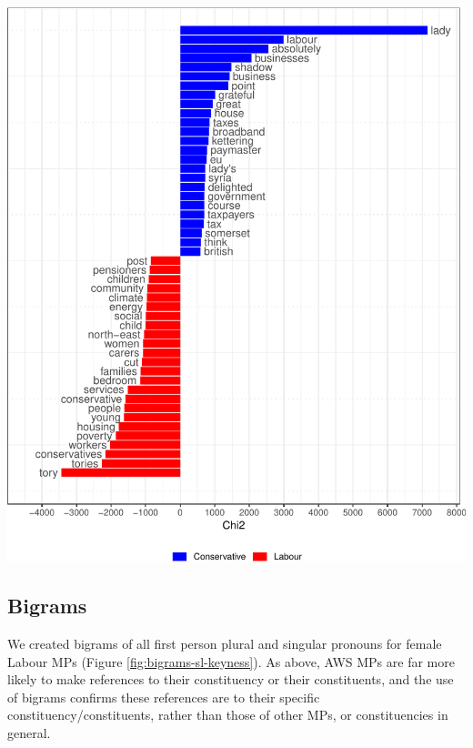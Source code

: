 \documentclass[]{article}
\let\origfigure\figure
\let\endorigfigure\endfigure
\renewenvironment{figure}[1][2] {
    \expandafter\origfigure\expandafter[H]
} {
    \endorigfigure
}
\theoremstyle{definition}
\theoremstyle{definition}
\theoremstyle{definition}
\theoremstyle{remark}
\begin{document}
\begin{figure}
\centering
\includegraphics{methodology_files/figure-latex/lab-con-keyness-1.pdf}
\caption{\label{fig:lab-con-keyness}Keyness between Labour and Conservative
MPs}
\end{figure}

\hypertarget{bigrams}{%
\subsection{Bigrams}\label{bigrams}}

We created bigrams of all first person plural and singular pronouns for
female Labour MPs (Figure \ref{fig:bigrams-sl-keyness}). As above, AWS
MPs are far more likely to make references to their constituency or
their constituents, and the use of bigrams confirms these references are
to their specific constituency/constituents, rather than those of other
MPs, or constituencies in general.
\end{document}
